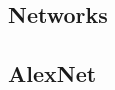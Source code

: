 \documentclass[11pt]{article} %
\begin{document}
\begin{appendices}
%


\section{Networks}
\label{sec:networkCodes}

\subsection{AlexNet}

\end{appendices}
\end{document}
